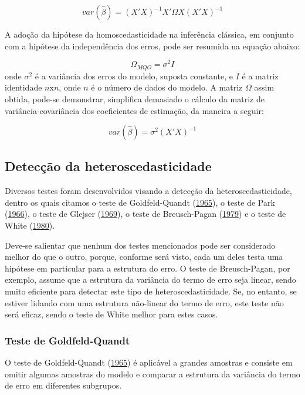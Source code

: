 \documentclass[a4paper, 12pt]{article}
\begin{document}
\[var(\hat{\beta})=(X'X)^{-1}X' \Omega X(X'X)^{-1}\]

A adoção da hipótese da homoscedasticidade na inferência clássica, em
conjunto com a hipótese da independência dos erros, pode ser resumida na
equação abaixo:

\[\Omega_{MQO}=\sigma^2I\] onde \(\sigma^2\) é a variância dos erros do
modelo, suposta constante, e \(I\) é a matriz identidade
\(n \text{x}n\), onde \(n\) é o número de dados do modelo. A matriz
\(\Omega\) assim obtida, pode-se demonstrar, simplifica demasiado o
cálculo da matriz de variância-covariância dos coeficientes de
estimação, da maneira a seguir:

\[var (\hat{\beta})=\sigma^2(X'X)^{-1}\]

\hypertarget{deteccao-da-heteroscedasticidade}{%
\subsection{Detecção da
heteroscedasticidade}\label{deteccao-da-heteroscedasticidade}}

Diversos testes foram desenvolvidos visando a detecção da
heteroscedasticidade, dentro os quais citamos o teste de Goldfeld-Quandt
(\protect\hyperlink{ref-GQ}{1965}), o teste de Park
(\protect\hyperlink{ref-Park}{1966}), o teste de Glejser
(\protect\hyperlink{ref-glejser}{1969}), o teste de Breusch-Pagan
(\protect\hyperlink{ref-BP}{1979}) e o teste de White
(\protect\hyperlink{ref-white1980}{1980}).

Deve-se salientar que nenhum dos testes mencionados pode ser considerado
melhor do que o outro, porque, conforme será visto, cada um deles testa
uma hipótese em particular para a estrutura do erro. O teste de
Breusch-Pagan, por exemplo, assume que a estrutura da variância do termo
de erro seja linear, sendo muito eficiente para detectar este tipo de
heteroscedasticidade. Se, no entanto, se estiver lidando com uma
estrutura não-linear do termo de erro, este teste não será eficaz, sendo
o teste de White melhor para estes casos.

\hypertarget{teste-de-goldfeld-quandt}{%
\subsubsection{Teste de
Goldfeld-Quandt}\label{teste-de-goldfeld-quandt}}

O teste de Goldfeld-Quandt (\protect\hyperlink{ref-GQ}{1965}) é
aplicável a grandes amostras e consiste em omitir algumas amostras do
modelo e comparar a estrutura da variância do termo de erro em
diferentes subgrupos.
\end{document}
